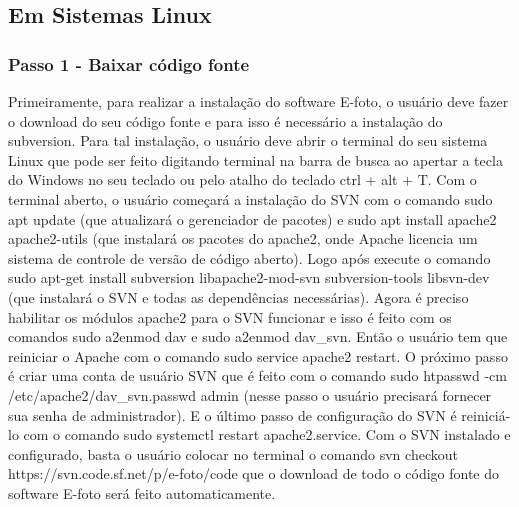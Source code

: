 \subsection{Em Sistemas Linux}

\subsubsection{Passo 1 - Baixar código fonte}
Primeiramente, para realizar a instalação do software E-foto, o usuário deve fazer o download do seu código fonte e para isso é necessário a instalação do subversion. Para tal instalação, o usuário deve abrir o terminal do seu sistema Linux que pode ser feito digitando terminal na barra de busca ao apertar a tecla do Windows no seu teclado ou pelo atalho do teclado ctrl + alt + T. Com o terminal aberto, o usuário começará a instalação do SVN com o comando sudo apt update (que atualizará o gerenciador de pacotes) e sudo apt install apache2 apache2-utils (que instalará os pacotes do apache2, onde Apache licencia um sistema de controle de versão de código aberto). Logo após execute o comando sudo apt-get install subversion libapache2-mod-svn subversion-tools libsvn-dev (que instalará o SVN e todas as dependências necessárias). Agora é preciso habilitar os módulos apache2 para o SVN funcionar e isso é feito com os comandos sudo a2enmod dav e sudo a2enmod dav\_svn. Então o usuário tem que reiniciar o Apache com o comando sudo service apache2 restart. O próximo passo é criar uma conta de usuário SVN que é feito com o comando sudo htpasswd -cm /etc/apache2/dav\_svn.passwd admin (nesse passo o usuário precisará fornecer sua senha de administrador). E o último passo de configuração do SVN é reiniciá-lo com o comando sudo systemctl restart apache2.service. Com o SVN instalado e configurado, basta o usuário colocar no terminal o comando svn checkout https://svn.code.sf.net/p/e-foto/code que o download de todo o código fonte do software E-foto será feito automaticamente.  %
    
